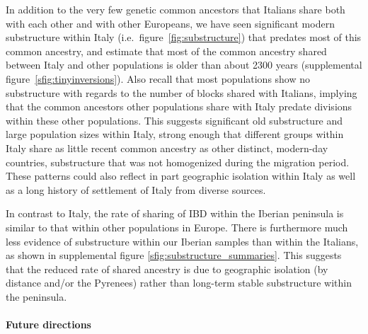 \documentclass{article}
\begin{document}
In addition to the very few genetic common ancestors that Italians share both with each other and with other Europeans,
we have seen significant modern substructure within Italy (i.e.\ figure~\ref{fig:substructure}) that predates most of this common ancestry,
and estimate that most of the common ancestry shared between Italy and other populations
is older than about 2300 years (supplemental figure~\ref{sfig:tinyinversions}).
Also recall that most populations show no substructure with regards to the number of blocks shared with Italians,
implying that the common ancestors other populations share with Italy predate divisions within these other populations.
This suggests significant old substructure and large population sizes within Italy,
strong enough that different groups within Italy
share as little recent common ancestry as other distinct, modern-day countries,
substructure that was not homogenized during the migration period.
These patterns could also reflect in part geographic isolation within
Italy as well as a long history of settlement of Italy from diverse sources.


In contrast to Italy, the rate of sharing of IBD within the Iberian peninsula is similar to that within other populations in Europe.
There is furthermore much less evidence of substructure within our
Iberian samples than within the Italians, as shown in supplemental figure \ref{sfig:substructure_summaries}.
This suggests that the reduced rate of shared ancestry is due to geographic isolation (by distance and/or the Pyrenees)
rather than long-term stable substructure within the peninsula. 







\paragraph{Future directions}
\end{document}
